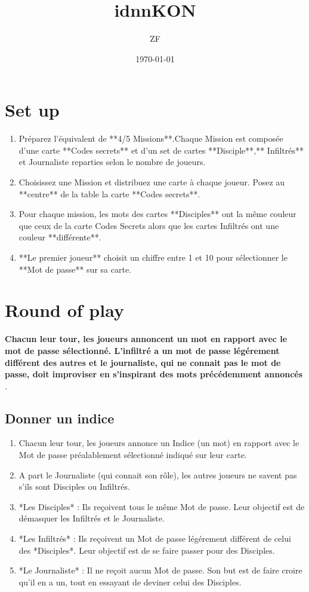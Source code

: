 \documentclass{article}%
\title{idnnKON}%
\author{ZF}%
\date{\today}%
\begin{document}
%
\pagestyle{empty}%
\normalsize%
\maketitle%
\section{ Set up
}%
\label{sec:Setup}%
\begin{enumerate}%
\item%
 Préparez l'équivalent de **4/5 Missions**.Chaque Mission est composée d'une carte **Codes secrets** et d'un set de cartes **Disciple**,** Infiltrés** et Journaliste reparties selon le nombre de joueurs.
%
\item%
 Choisissez une Mission et distribuez une carte à chaque joueur. Posez au **centre** de la table la carte **Codes secrets**.
%
\item%
 Pour chaque mission, les mots des cartes **Disciples** ont la même couleur que ceux de la carte Codes Secrets alors que les cartes Infiltrés ont une couleur **différente**.
%
\item%
 **Le premier joueur** choisit un chiffre entre 1 et 10 pour sélectionner le **Mot de passe** sur sa carte.
%
\end{enumerate}

%
\section{ Round of play
}%
\label{sec:Roundofplay}%
\textbf{Chacun leur tour, les joueurs annoncent un mot en rapport avec le mot de passe sélectionné. L'infiltré a un mot de passe légérement différent des autres et le journaliste, qui ne connait pas le mot de passe, doit improviser en s'inspirant des mots précédemment annoncés}%
\textit{.
}

%
\subsection{ Donner un indice
}%
\label{subsec:Donnerunindice}%
\begin{enumerate}%
\item%
 Chacun leur tour, les joueurs annonce un Indice (un mot) en rapport avec le Mot de passe préalablement sélectionné indiqué sur leur carte.
%
\item%
 A part le Journaliste (qui connait son rôle), les autres joueurs ne savent pas s'ils sont Disciples ou Infiltrés.
%
\item%
 *Les Disciples* : Ils reçoivent tous le même Mot de passe. Leur objectif est de démasquer les Infiltrés et le Journaliste.
%
\item%
 *Les Infiltrés* : Ils reçoivent un Mot de passe légérement différent de celui des *Disciples*. Leur objectif est de se faire passer pour des Disciples.
%
\item%
 *Le Journaliste* : Il ne reçoit aucun Mot de passe. Son but est de faire croire qu'il en a un, tout en essayant de deviner celui des Disciples.
%
\end{enumerate}
\end{document}
